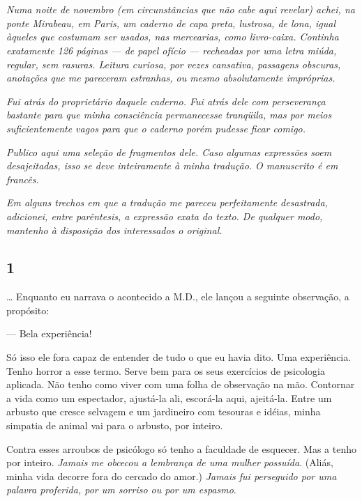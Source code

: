 \chapter*{}

\emph{Numa noite de novembro (em circunstâncias que não cabe aqui
revelar) achei, na ponte Mirabeau, em Paris, um caderno de capa preta,
lustrosa, de lona, igual àqueles que costumam ser usados, nas
mercearias, como livro-caixa. Continha exatamente 126 páginas --- de papel
ofício --- recheadas por uma letra miúda, regular, sem rasuras. Leitura
curiosa, por vezes cansativa, passagens obscuras, anotações que me
pareceram estranhas, ou mesmo absolutamente impróprias.}

\emph{Fui atrás do proprietário daquele caderno. Fui atrás dele com
perseverança bastante para que minha consciência permanecesse tranqüila,
mas por meios suficientemente vagos para que o caderno porém pudesse
ficar comigo.}

\emph{Publico aqui uma seleção de fragmentos dele. Caso algumas
expressões soem desajeitadas, isso se deve inteiramente à minha
tradução. O manuscrito é em francês.}

\emph{Em alguns trechos em que a tradução me pareceu perfeitamente
desastrada, adicionei, entre parêntesis, a expressão exata do texto. De
qualquer modo, mantenho à disposição dos interessados o original.}

\section{1}

\ldots{} Enquanto eu narrava o acontecido a M.D., ele lançou a seguinte
observação, a propósito:

--- Bela experiência!

Só isso ele fora capaz de entender de tudo o que eu havia dito. Uma
experiência. Tenho horror a esse termo. Serve bem para os seus
exercícios de psicologia aplicada. Não tenho como viver com uma folha de
observação na mão. Contornar a vida como um espectador, ajustá-la ali,
escorá-la aqui, ajeitá-la. Entre um arbusto que cresce selvagem e um
jardineiro com tesouras e idéias, minha simpatia de animal vai para o
arbusto, por inteiro.

Contra esses arroubos de psicólogo só tenho a faculdade de esquecer. Mas
a tenho por inteiro. \emph{Jamais me obcecou a lembrança de uma mulher
possuída}. (Aliás, minha vida decorre fora do cercado do amor.)
\emph{Jamais fui perseguido por uma palavra proferida, por um sorriso ou
por um espasmo}.

